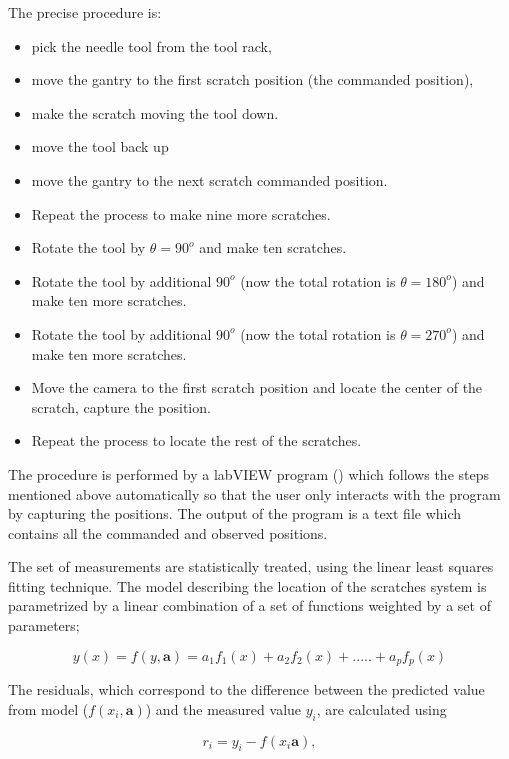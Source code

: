The precise procedure is:

\begin{itemize}
\item pick the needle tool from the tool rack,
\item move the gantry to the first scratch position (the commanded position),
\item make the scratch moving the tool down.
\item move the tool back up
\item move the gantry to the next scratch commanded position.
\item Repeat the process to make nine more scratches.
\item Rotate the tool by $\theta=90^o$ and make ten scratches.
\item Rotate the tool by additional $90^o$ (now the total rotation is $\theta=180^o$) and make ten more scratches.
\item Rotate the tool by additional $90^o$ (now the total rotation is $\theta=270^o$) and make ten more scratches.
\item Move the camera to the first scratch position and locate the center of the scratch, capture the position.
\item Repeat the process to locate the rest of the scratches.   
\end{itemize}

The procedure is performed by a labVIEW program () which follows the steps mentioned above automatically so that the user only interacts with the program by capturing the positions. The output of the program is a text file which contains all the commanded and observed positions.
      
The set of measurements are statistically treated, using the linear least squares fitting technique. The model describing the location of the scratches system is parametrized by a linear combination of a set of functions weighted by a set of parameters;

\begin{equation}
y(x)= f(y,\textbf{a})=a_1f_1(x)+a_2f_2(x)+.....+a_pf_p(x)
\end{equation}

The residuals, which correspond to the difference between the predicted value from model ($f(x_i, \textbf{a})$) and the measured value $y_i$, are calculated using 

\begin{equation}
r_i= y_i - f(x_i\textbf{a}),
\end{equation}

